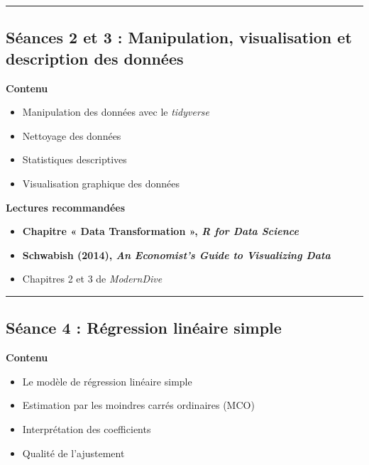\documentclass[
  11pt,
]{article}
\providecommand{\tightlist}{%
  \setlength{\itemsep}{0pt}\setlength{\parskip}{0pt}}
\begin{document}
\begin{center}\rule{0.5\linewidth}{0.5pt}\end{center}

\subsection{Séances 2 et 3 : Manipulation, visualisation et description
des
données}\label{suxe9ances-2-et-3-manipulation-visualisation-et-description-des-donnuxe9es}

\textbf{Contenu}

\begin{itemize}
\tightlist
\item
  Manipulation des données avec le \emph{tidyverse}
\item
  Nettoyage des données
\item
  Statistiques descriptives
\item
  Visualisation graphique des données
\end{itemize}

\textbf{Lectures recommandées}

\begin{itemize}
\tightlist
\item
  \textbf{Chapitre « Data Transformation », \emph{R for Data Science}}
\item
  \textbf{Schwabish (2014), \emph{An Economist's Guide to Visualizing
  Data}}
\item
  Chapitres 2 et 3 de \emph{ModernDive}
\end{itemize}

\begin{center}\rule{0.5\linewidth}{0.5pt}\end{center}

\subsection{Séance 4 : Régression linéaire
simple}\label{suxe9ance-4-ruxe9gression-linuxe9aire-simple}

\textbf{Contenu}

\begin{itemize}
\tightlist
\item
  Le modèle de régression linéaire simple
\item
  Estimation par les moindres carrés ordinaires (MCO)
\item
  Interprétation des coefficients
\item
  Qualité de l'ajustement
\end{itemize}
\end{document}
